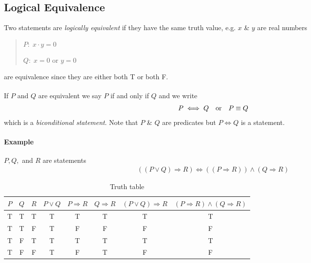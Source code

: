 \documentclass[../main.tex]{subfiles}
\begin{document}
\subsection{Logical Equivalence}

Two statements are \emph{logically equivalent} if they have the same truth value, e.g. $x$ \& $y$
are real numbers
\begin{quote}
    $P: \; x \cdot y = 0$

    $Q: \; x = 0$ or $y = 0$
\end{quote}
are equivalence since they are either both T or both F.

\paragraph{}

If $P$ and $Q$ are equivalent we say $P$ if and only if $Q$ and we write
\begin{align*}
    P \iff Q \qqtext{or} P \equiv Q
\end{align*}
which is a \emph{biconditional statement}. Note that $P$ \& $Q$ are predicates but $P \iff Q$ is a
statement.

\paragraph{Example} $P, Q,$ and $R$ are statements
\begin{align*}
    ((P \lor Q) \Rightarrow R) \iff ((P \Rightarrow R)) \land (Q \Rightarrow R)
\end{align*}
\begin{table}[ht]
    \centering
    \begin{tabular}{c|c|c|c|c|c|c|c}
        $P$ & $Q$ & $R$ & $P \lor Q$ & $P \Rightarrow R$ & $Q \Rightarrow R$ & $(P \lor Q) \Rightarrow R$  & $(P \Rightarrow R) \land (Q \Rightarrow R)$ \\
        \hline
        T & T & T & T & T & T & T & T \\
        T & T & F & T & F & F & F & F \\
        T & F & T & T & T & T & T & T \\
        T & F & F & T & F & T & F & F \\
    \end{tabular}
    \caption{Truth table}
\end{table}

\newpage
{}
\end{document}
